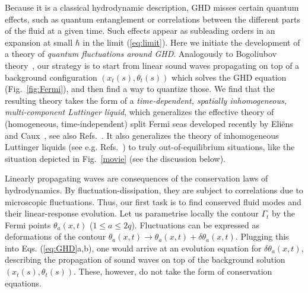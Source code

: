 \documentclass[twocolumn,amsfonts,showpacs,superscriptaddress]{revtex4-1}
\begin{document}
\vspace{0.1cm} \; Because it is a classical hydrodynamic description, GHD misses certain quantum effects, such as quantum entanglement or correlations between the different parts of the fluid at a given time. Such effects appear as subleading orders in an expansion at small $\hbar$ in the limit (\ref{eq:limit}). Here we initiate the development of a theory of {\it quantum fluctuations around GHD}. Analogously to Bogoliubov theory~\cite{bogolyubov1947theory,pitaevskii2016bose,mora2003extension}, our strategy is to start from linear sound waves propagating on top of a background configuration $(x_t(s), \theta_t(s))$ which solves the GHD equation (Fig.~\ref{fig:Fermi}), and then find a way to quantize those. We find that the resulting theory takes the form of a {\it time-dependent, spatially inhomogeneous, multi-component Luttinger liquid}, which generalizes the effective theory of (homogeneous, time-independent) split Fermi seas developed recently by Eli\"ens and Caux~\cite{eliens2016general}, see also Refs.~\cite{fokkema2014split,vlijm2016correlations,eliens2017quantum}. It also generalizes the theory of inhomogeneous Luttinger liquids (see e.g. Refs.~\cite{gangardt2003stability,abanov2006hydrodynamics,dubail2017conformal,brun2017one,brun2018inhomogeneous,ruggiero2019conformal,cazalilla2004bosonizing}) to truly out-of-equilibrium situations, like the situation depicted in  Fig.~\ref{movie} (see the discussion below).





\vspace{0.1cm} \; Linearly propagating waves are consequences of the conservation laws of hydrodynamics. By fluctuation-dissipation, they are subject to correlations due to microscopic fluctuations. Thus, our first task is to find conserved fluid modes and their linear-response evolution. Let us parametrise locally the contour $\Gamma_t$ by the Fermi points $\theta_a(x,t)$ ($1 \leq a \leq 2q$). Fluctuations can be expressed as deformations of the contour $\theta_a(x,t)\rightarrow \theta_a(x,t)+\delta \theta_a(x,t)$. Plugging this into Eqs. (\ref{eq:GHD}a,b), one would arrive at an evolution equation for $\delta \theta_a (x,t)$, describing the propagation of sound waves on top of the background solution $(x_t (s) , \theta_t(s) )$. These, however, do not take the form of conservation equations.
\end{document}
